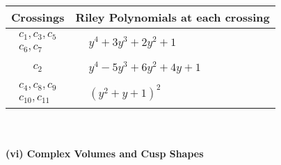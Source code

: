 \documentclass[1p]{elsarticle_modified}
\theoremstyle{definition}
\begin{document}
\begin{tabular}{m{50pt}|m{274pt}}
Crossings & \hspace{64pt}Riley Polynomials at each crossing \\
\hline $$\begin{aligned}c_{1},c_{3},c_{5}\\c_{6},c_{7}\end{aligned}$$&$\begin{aligned}
&y^4+3 y^3+2 y^2+1
\end{aligned}$\\
\hline $$\begin{aligned}c_{2}\end{aligned}$$&$\begin{aligned}
&y^4-5 y^3+6 y^2+4 y+1
\end{aligned}$\\
\hline $$\begin{aligned}c_{4},c_{8},c_{9}\\c_{10},c_{11}\end{aligned}$$&$\begin{aligned}
&(y^2+y+1)^2
\end{aligned}$\\
\hline
\end{tabular}\\~\\
\newpage\flushleft \textbf{(vi) Complex Volumes and Cusp Shapes}
\end{document}
